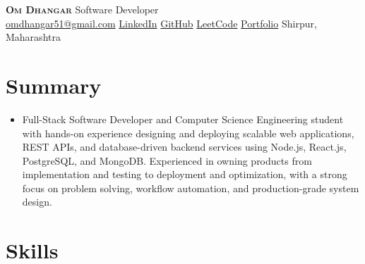 \documentclass[letterpaper,10pt]{article}
\newcommand{\resumeItem}[1]{
  \item\small{{#1}\vspace{-1.5pt}}
}
\newcommand{\resumeSubHeadingListStart}{\begin{itemize}[leftmargin=0.15in, label={}]}
\newcommand{\resumeSubHeadingListEnd}{\end{itemize}}
\begin{document}

\begin{center}
    \textbf{\Huge \scshape Om Dhangar} \textbar{} \Large Software Developer \\

    \small
    \href{mailto:omdhangar51@gmail.com}{omdhangar51@gmail.com} \textbar{}
    \href{https://www.linkedin.com/in/om-dhangar-21219627a}{LinkedIn} \textbar{}
    \href{https://github.com/OmDhangar}{GitHub} \textbar{}
    \href{https://leetcode.com/omdhangar24}{LeetCode} \textbar{}
    \href{https://omdhangar.vercel.app/}{Portfolio} \textbar{}
    Shirpur, Maharashtra
\end{center}

\vspace{-14pt}


\section{Summary}
\resumeSubHeadingListStart
\resumeItem{Full-Stack Software Developer and Computer Science Engineering student with hands-on experience designing and deploying scalable web applications, REST APIs, and database-driven backend services using Node.js, React.js, PostgreSQL, and MongoDB. Experienced in owning products from implementation and testing to deployment and optimization, with a strong focus on problem solving, workflow automation, and production-grade system design. }
\resumeSubHeadingListEnd

\vspace{-14pt}


\section{Skills}
\end{document}
